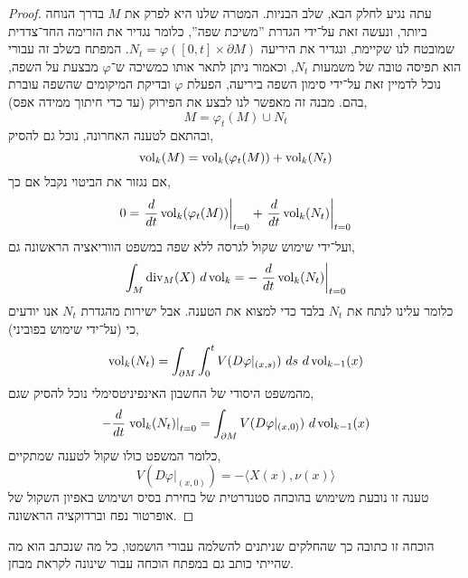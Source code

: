 \begin{proof}
	עתה נגיע לחלק הבא, שלב הבניות.
	המטרה שלנו היא לפרק את $M$ בדרך הנוחה ביותר, ונעשה זאת על־ידי הגדרת ''משיכת שפה'', כלומר נגדיר את הזרימה החד־צדדית שמובטח לנו שקיימת, ונגדיר את היריעה $N_t = \varphi([0, t] \times \partial M)$.
	המפתח בשלב זה עבורי הוא תפיסה טובה של משמעות $N_t$, וכאמור ניתן לתאר אותו כמשיכה ש־$\varphi$ מבצעת על השפה, נוכל לדמיין זאת על־ידי סימון השפה ביריעה, הפעלת $\varphi$ ובדיקת המיקומים שהשפה עוברת בהם.
	מבנה זה מאפשר לנו לבצע את הפירוק (עד כדי חיתוך ממידה אפס),
	\[
		M = \varphi_t(M) \cup N_t
	\]
	ובהתאם לטענה האחרונה, נוכל גם להסיק,
	\[
		\operatorname{vol}_k(M)
		= \operatorname{vol}_k(\varphi_t(M)) + \operatorname{vol}_k(N_t)
	\]
	אם נגזור את הביטוי נקבל אם כך,
	\[
		0 = 
		\left. \frac{d}{dt} \operatorname{vol}_k(\varphi_t(M)) \right\lvert_{t = 0}
		+ \left. \frac{d}{dt} \operatorname{vol}_k(N_t) \right\lvert_{t = 0}
	\]
	ועל־ידי שימוש שקול לגרסה ללא שפה במשפט הווריאציה הראשונה גם,
	\[
		\int_M \operatorname{div}_M(X)\ d\operatorname{vol}_k
		= - \left. \frac{d}{dt} \operatorname{vol}_k(N_t) \right\lvert_{t = 0}
	\]
	כלומר עלינו לנתח את $N_t$ בלבד כדי למצוא את הטענה.
	אבל ישירות מהגדרת $N_t$ אנו יודעים כי (על־ידי שימוש בפוביני),
	\[
		\vol_k(N_t)
		= \int_{\partial M} \int_{0}^{t} V(D \varphi |_{(x, s)})\ ds\ d\vol_{k - 1}(x)
	\]
	מהמשפט היסודי של החשבון האינפיניטסימלי נוכל להסיק שגם,
	\[
		- \frac{d}{dt} \left. \operatorname{vol}_k(N_t) \right\lvert_{t = 0}
		= \int_{\partial M} V(D \varphi |_{(x, 0)})\ d\operatorname{vol}_{k - 1}(x)
	\]
	כלומר המשפט כולו שקול לטענה שמתקיים,
	\[
		V(D \varphi |_{(x, 0)}) = - \langle X(x), \nu(x) \rangle
	\]
	טענה זו נובעת משימוש בהוכחה סטנדרטית של בחירת בסיס ושימוש באפיון השקול של אופרטור נפח וברדוקציה הראשונה.
\end{proof}
הוכחה זו כתובה כך שהחלקים שניתנים להשלמה עבורי הושמטו, כל מה שנכתב הוא מה שהייתי כותב גם במפתח הוכחה עבור שינונה לקראת מבחן.


